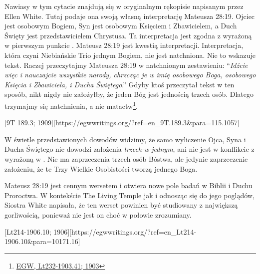 Nawiasy w tym cytacie znajdują się w oryginalnym rękopisie napisanym przez Ellen White. Tutaj podaje ona swoją własną interpretację Mateusza 28:19. Ojciec jest osobowym Bogiem, Syn jest osobowym Księciem i Zbawicielem, a Duch Święty jest przedstawicielem Chrystusa. Ta interpretacja jest zgodna z  wyrażoną w pierwszym punkcie . Mateusz 28:19 jest kwestią interpretacji. Interpretacja, która czyni Niebiańskie Trio jednym Bogiem, nie jest natchniona. Nie to wskazuje tekst. Raczej przeczytajmy Mateusza 28:19 w natchnionym zestawieniu: “\textit{Idźcie więc i nauczajcie wszystkie narody, chrzcząc je w imię osobowego Boga, osobowego Księcia i Zbawiciela, i Ducha Świętego}.” Gdyby ktoś przeczytał tekst w ten sposób, nikt nigdy nie założyłby, że jeden Bóg jest jednością trzech osób. Dlatego trzymajmy się natchnienia, a nie matactw\footnote{\href{https://egwwritings.org/?ref=en\_Lt232-1903.41&para=10197.50}{{EGW, Lt232-1903.41; 1903}}}.

[9T 189.3; 1909][https://egwwritings.org/?ref=en\_9T.189.3&para=115.1057]

W świetle przedstawionych dowodów widzimy, że samo wyliczenie Ojca, Syna i Ducha Świętego nie dowodzi założenia \textit{trzech-w-jednym}, ani nie jest w konflikcie z  wyrażoną w . Nie ma zaprzeczenia trzech osób Bóstwa, ale jedynie zaprzeczenie założeniu, że te Trzy Wielkie Osobistości tworzą jednego Boga.

Mateusz 28:19 jest cennym wersetem i otwiera nowe pole badań w Biblii i Duchu Proroctwa. W kontekście The Living Temple jak i odnosząc się do jego poglądów, Siostra White napisała, że ten werset powinien być studiowany z największą gorliwością, ponieważ nie jest on choć w  połowie zrozumiany.

[Lt214-1906.10; 1906][https://egwwritings.org/?ref=en\_Lt214-1906.10&para=10171.16]

